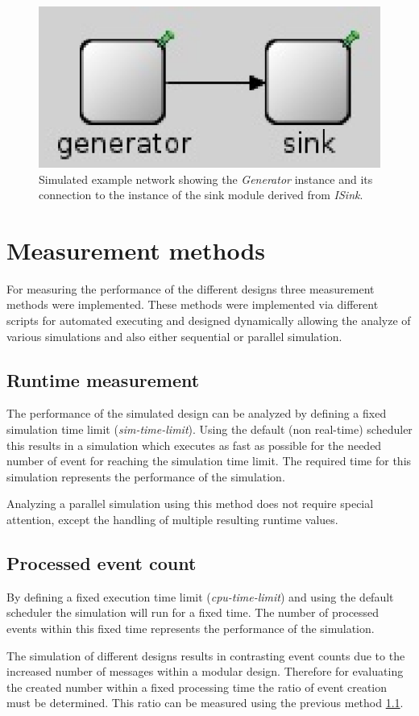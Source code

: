 \begin{figure}
    \centering
    \includegraphics[width=0.3\linewidth]{images/omnet_example_network}
    \caption{Simulated example network showing the \emph{Generator} instance and its connection to the instance of the sink module derived from \emph{ISink}.}
    \label{fig:omnet_example_network}
\end{figure}

\section{Measurement methods}
\label{sec:measurements_methods}
For measuring the performance of the different designs three measurement methods were implemented.
These methods were implemented via different scripts for automated executing and designed dynamically allowing the analyze of various simulations and also either sequential or parallel simulation.

\subsection{Runtime measurement}
\label{sec:measurements_methods_runtime}
The performance of the simulated design can be analyzed by defining a fixed simulation time limit (\emph{sim-time-limit}).
Using the default (non real-time) scheduler this results in a simulation which executes as fast as possible for the needed number of event for reaching the simulation time limit.
The required time for this simulation represents the performance of the simulation.

Analyzing a parallel simulation using this method does not require special attention, except the handling of multiple resulting runtime values.

\subsection{Processed event count}
\label{sec:measurements_methods_event}
By defining a fixed execution time limit (\emph{cpu-time-limit}) and using the default scheduler the simulation will run for a fixed time.
The number of processed events within this fixed time represents the performance of the simulation.

The simulation of different designs results in contrasting event counts due to the increased number of messages within a modular design.
Therefore for evaluating the created number within a fixed processing time the ratio of event creation must be determined.
This ratio can be measured using the previous method \ref{sec:measurements_methods_runtime}.

